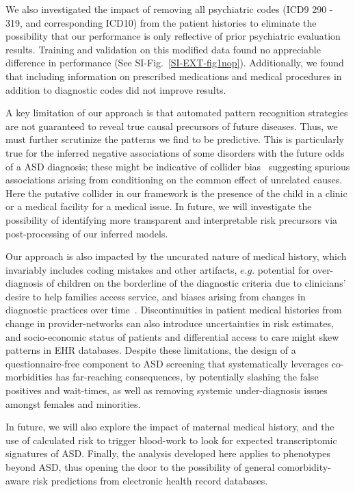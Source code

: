 \documentclass[onecolumn,10pt]{IEEEtran}
\begin{document}
We also investigated the impact of removing all psychiatric codes (ICD9 290 - 319, and corresponding ICD10) from the patient histories to eliminate the possibility that our performance is only reflective of prior psychiatric evaluation results. Training and validation on this modified data found  no appreciable difference in performance (See SI-Fig.~\ref{SI-EXT-fig1nop}).
Additionally, we found that including information on prescribed medications and medical procedures in addition to diagnostic codes did not improve results.

  A key  limitation of our approach is that automated pattern recognition strategies are not guaranteed to reveal true causal precursors of future diseases. {\HCOL Thus, we must  further scrutinize the patterns we find to be predictive. This is particularly true for the inferred  negative associations of some disorders  with the future odds of a ASD diagnosis; these might be indicative of collider bias~\cite{berkson1946limitations} suggesting spurious associations arising from conditioning on the common effect of unrelated causes. Here the putative collider in our framework is the presence of the child in a clinic or a medical facility for a medical issue. In future, we will  investigate the possibility of identifying more transparent and interpretable risk precursors via post-processing of our inferred models.}

Our approach is also impacted by the uncurated nature of medical history, which invariably includes coding mistakes and other artifacts, $e.g.$   potential for  over-diagnosis of  children on the borderline of the diagnostic criteria due to clinicians' desire to help families access service, and biases arising from changes in diagnostic practices over time~\cite{10.1001/jamapsychiatry.2019.1956}. Discontinuities in patient medical histories from change in provider-networks  can also introduce  uncertainties  in risk estimates, and socio-economic status of patients and differential access to care  might skew patterns in EHR databases. Despite these limitations, the design of a questionnaire-free component to ASD screening  that systematically leverages co-morbidities  has far-reaching consequences, by potentially slashing the false positives and wait-times, as well as removing systemic under-diagnosis issues amongst females and minorities. 

In future, we will also explore the impact of  maternal medical history, and the  use of calculated risk to trigger   blood-work to look for expected  transcriptomic  signatures of ASD. Finally,  the analysis developed here applies to phenotypes beyond ASD, thus opening the door to the possibility of  general  comorbidity-aware risk predictions  from electronic health record databases. 
\end{document}
